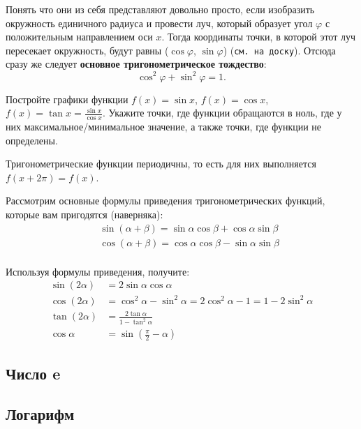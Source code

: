 Понять что они из себя представляют довольно просто, если изобразить окружность единичного радиуса и провести луч, который образует угол $\varphi$ с положительным направлением оси $x$. Тогда координаты точки, в которой этот луч пересекает окружность, будут равны ($\cos \varphi$, $\sin \varphi$) (\texttt{см. на доску}). Отсюда сразу же следует \textbf{основное тригонометрическое тождество}:
\begin{equation*}
    \cos^2 \varphi + \sin^2 \varphi = 1.
\end{equation*}
\begin{prac}
    Постройте графики функции $f(x) = \sin x$, $f(x) = \cos x$, $f(x) = \tan x = \frac{\sin x}{\cos x}$. Укажите точки, где функции обращаются в ноль, где у них максимальное/минимальное значение, а также точки, где функции не определены. 
\end{prac}
\begin{rem}
    Тригонометрические функции периодичны, то есть для них выполняется $f(x + 2\pi) = f(x)$.
\end{rem}
Рассмотрим основные формулы приведения тригонометрических функций, которые вам пригодятся (наверняка):
\begin{eqnarray*}
    && \sin(\alpha + \beta) = \sin \alpha \cos \beta + \cos \alpha \sin \beta\\
    && \cos(\alpha + \beta) = \cos \alpha \cos \beta - \sin \alpha \sin \beta\\
\end{eqnarray*}

\begin{prac}
    Используя формулы приведения, получите:
    \begin{align*}
        \sin(2\alpha) &= 2 \sin \alpha \cos \alpha\\
        \cos(2\alpha) &= \cos^2 \alpha - \sin^2 \alpha = 2\cos^2 \alpha - 1 = 1 - 2\sin^2 \alpha\\
        \tan(2\alpha) &= \frac{2\tan \alpha}{1 - \tan^2 \alpha}\\
        \cos \alpha &= \sin (\frac{\pi}{2} - \alpha)
    \end{align*}
\end{prac}

\subsection{Число e}
\subsection{Логарифм}